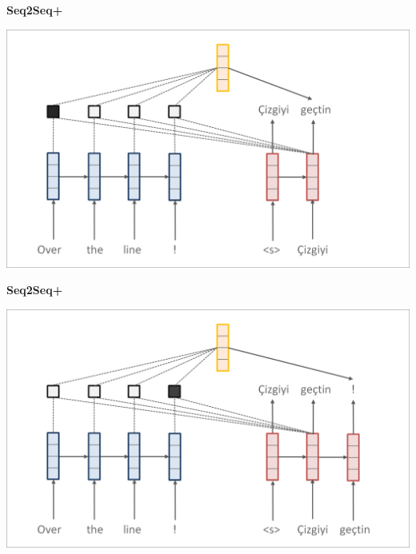 \documentclass[aspectratio=169,12pt]{beamer}
\newcommand{\air}{\vspace{0.25cm}}
\begin{document}
\begin{frame}
  \begin{center}
    \textbf{Seq2Seq+} \air

  \end{center}
\center
\vspace{-5mm}
 \air
\includegraphics[scale=0.37]{nmt-attn8}
\end{frame}
\begin{frame}
  \begin{center}
    \textbf{Seq2Seq+} \air

  \end{center}
\center
\vspace{-5mm}
 \air
\includegraphics[scale=0.37]{nmt-attn9}
\end{frame}
\end{document}
